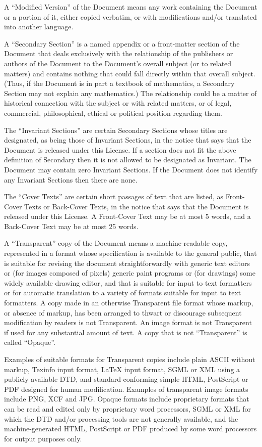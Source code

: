 A ``Modified Version'' of the Document means any work containing the
Document or a portion of it, either copied verbatim, or with
modifications and/or translated into another language.

A ``Secondary Section'' is a named appendix or a front-matter section of
the Document that deals exclusively with the relationship of the
publishers or authors of the Document to the Document's overall subject
(or to related matters) and contains nothing that could fall directly
within that overall subject. (Thus, if the Document is in part a
textbook of mathematics, a Secondary Section may not explain any
mathematics.) The relationship could be a matter of historical
connection with the subject or with related matters, or of legal,
commercial, philosophical, ethical or political position regarding them.

The ``Invariant Sections'' are certain Secondary Sections whose titles
are designated, as being those of Invariant Sections, in the notice that
says that the Document is released under this License. If a section does
not fit the above definition of Secondary then it is not allowed to be
designated as Invariant. The Document may contain zero Invariant
Sections. If the Document does not identify any Invariant Sections then
there are none.

The ``Cover Texts'' are certain short passages of text that are listed,
as Front-Cover Texts or Back-Cover Texts, in the notice that says that
the Document is released under this License. A Front-Cover Text may be
at most 5 words, and a Back-Cover Text may be at most 25 words.

A ``Transparent'' copy of the Document means a machine-readable copy,
represented in a format whose specification is available to the general
public, that is suitable for revising the document straightforwardly
with generic text editors or (for images composed of pixels) generic
paint programs or (for drawings) some widely available drawing editor,
and that is suitable for input to text formatters or for automatic
translation to a variety of formats suitable for input to text
formatters. A copy made in an otherwise Transparent file format whose
markup, or absence of markup, has been arranged to thwart or discourage
subsequent modification by readers is not Transparent. An image format
is not Transparent if used for any substantial amount of text. A copy
that is not ``Transparent'' is called ``Opaque''.

Examples of suitable formats for Transparent copies include plain ASCII
without markup, Texinfo input format, LaTeX input format, SGML or XML
using a publicly available DTD, and standard-conforming simple HTML,
PostScript or PDF designed for human modification. Examples of
transparent image formats include PNG, XCF and JPG. Opaque formats
include proprietary formats that can be read and edited only by
proprietary word processors, SGML or XML for which the DTD and/or
processing tools are not generally available, and the machine-generated
HTML, PostScript or PDF produced by some word processors for output
purposes only.


